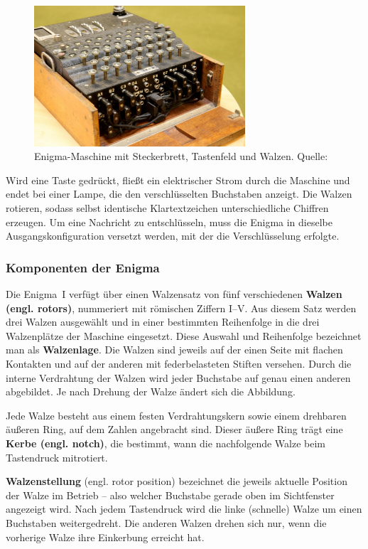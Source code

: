 \documentclass[12pt, ngerman, a4paper, numbers=noenddot]{article}
\begin{document}
\begin{figure}[H]
	\centering
	\includegraphics[width=0.7\textwidth]{bilder/enigma_stecker.jpg}
	\caption{Enigma-Maschine mit Steckerbrett, Tastenfeld und Walzen. Quelle: \cite{welt:enigma}}
	\label{fig:enigma_overview}
\end{figure}

Wird eine Taste gedrückt, fließt ein elektrischer Strom durch die Maschine und endet bei einer Lampe, die den verschlüsselten Buchstaben anzeigt. Die Walzen rotieren, sodass selbst identische Klartextzeichen unterschiedliche Chiffren erzeugen. Um eine Nachricht zu entschlüsseln, muss die Enigma in dieselbe Ausgangskonfiguration versetzt werden, mit der die Verschlüsselung erfolgte.



\subsubsection{Komponenten der Enigma} 
Die Enigma~I verfügt über einen Walzensatz von fünf verschiedenen \textbf{Walzen (engl. rotors)}, nummeriert mit römischen Ziffern I–V. Aus diesem Satz werden drei Walzen ausgewählt und in einer bestimmten Reihenfolge in die drei Walzenplätze der Maschine eingesetzt. Diese Auswahl und Reihenfolge bezeichnet man als \textbf{Walzenlage}. Die Walzen sind jeweils auf der einen Seite mit flachen Kontakten und auf der anderen mit federbelasteten Stiften versehen. Durch die interne Verdrahtung der Walzen wird jeder Buchstabe auf genau einen anderen abgebildet. Je nach Drehung der Walze ändert sich die Abbildung.

Jede Walze besteht aus einem festen Verdrahtungskern sowie einem drehbaren äußeren Ring, auf dem Zahlen angebracht sind. Dieser äußere Ring trägt eine \textbf{Kerbe (engl. notch)}, die bestimmt, wann die nachfolgende Walze beim Tastendruck mitrotiert.

\textbf{Walzenstellung} (engl. rotor position) bezeichnet die jeweils aktuelle Position der Walze im Betrieb – also welcher Buchstabe gerade oben im Sichtfenster angezeigt wird. Nach jedem Tastendruck wird die linke (schnelle) Walze um einen Buchstaben weitergedreht. Die anderen Walzen drehen sich nur, wenn die vorherige Walze ihre Einkerbung erreicht hat.  
\end{document}

